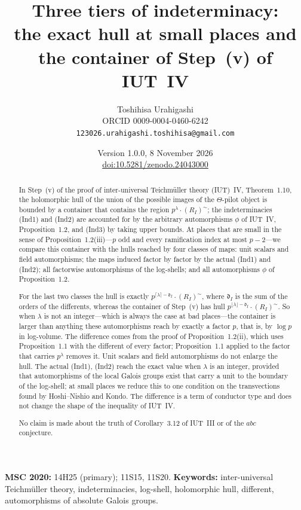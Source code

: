 \documentclass[11pt,a4paper]{article}
\title{Three tiers of indeterminacy:\\ the exact hull at small places and the container of Step~(v) of IUT~IV}
\author{Toshihisa Urahigashi\\\small ORCID 0009-0004-0460-6242\\\small\texttt{123026.urahigashi.toshihisa@gmail.com}}
\date{Version 1.0.0, 8 November 2026\\\small\href{https://doi.org/10.5281/zenodo.24043000}{doi:10.5281/zenodo.24043000}}
\newcommand{\fd}{\mathfrak{d}}
\newcommand{\tI}{(R_I)^{\sim}}
\newcommand{\ceil}[1]{\lceil #1\rceil}
\newcommand{\floor}[1]{\lfloor #1\rfloor}
\theoremstyle{plain}
\theoremstyle{definition}
\theoremstyle{remark}
\begin{document}
\maketitle

\begin{abstract}
In Step~(v) of the proof of inter-universal Teichm\"uller theory (IUT)~IV, Theorem~1.10, the holomorphic hull of
the union of the possible images of the $\Theta$-pilot object is bounded by a container that contains the region
$p^{\lambda}\cdot\tI$; the indeterminacies (Ind1) and (Ind2) are accounted for by the arbitrary automorphisms $\phi$ of
IUT~IV, Proposition~1.2, and (Ind3) by taking upper bounds. At places that are small in the sense of
Proposition~1.2(iii)---$p$ odd and every ramification index at most $p-2$---we compare this container with the hulls
reached by four classes of maps: unit scalars and field automorphisms; the maps induced factor by factor by the
actual (Ind1) and (Ind2); all factorwise automorphisms of the log-shells; and all automorphisms $\phi$ of
Proposition~1.2.

For the last two classes the hull is exactly $p^{\ceil{\lambda}-\fd_I}\cdot\tI$, where $\fd_I$ is the sum of the
orders of the differents, whereas the container of Step~(v) has hull $p^{\floor{\lambda}-\fd_I}\cdot\tI$. So when
$\lambda$ is not an integer---which is always the case at bad places---the container is larger than anything these
automorphisms reach by exactly a factor $p$, that is, by $\log p$ in log-volume. The difference comes from the proof
of Proposition~1.2(ii), which uses Proposition~1.1 with the different of every factor; Proposition~1.1 applied to the
factor that carries $p^{\lambda}$ removes it. Unit scalars and field automorphisms do not enlarge the hull. The actual
(Ind1), (Ind2) reach the exact value when $\lambda$ is an integer, provided that automorphisms of the local Galois
groups exist that carry a unit to the boundary of the log-shell; at small places we reduce this to one condition on
the transvections found by Hoshi--Nishio and Kondo. The difference is a term of conductor type and does not change the
shape of the inequality of IUT~IV.

No claim is made about the truth of Corollary~3.12 of IUT~III or of the $abc$ conjecture.
\end{abstract}

\noindent\textbf{MSC 2020:} 14H25 (primary); 11S15, 11S20.\quad
\textbf{Keywords:} inter-universal Teichm\"uller theory, indeterminacies, log-shell, holomorphic hull, different,
automorphisms of absolute Galois groups.
\end{document}
